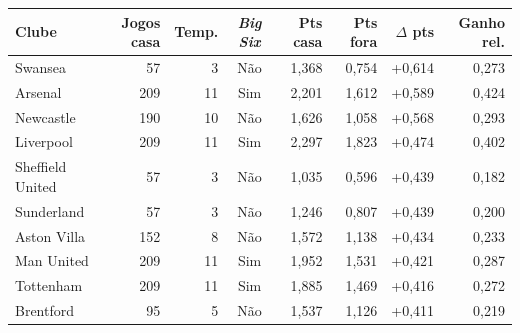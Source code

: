 \begin{tabular}{lrrcrrrr}
  \toprule
  Clube & Jogos casa & Temp. & \textit{Big Six} & Pts casa & Pts fora & $\Delta$ pts & Ganho rel. \\
  \midrule
  Swansea & 57 & 3 & Não & 1,368 & 0,754 & +0,614 & 0,273 \\
  Arsenal & 209 & 11 & Sim & 2,201 & 1,612 & +0,589 & 0,424 \\
  Newcastle & 190 & 10 & Não & 1,626 & 1,058 & +0,568 & 0,293 \\
  Liverpool & 209 & 11 & Sim & 2,297 & 1,823 & +0,474 & 0,402 \\
  Sheffield United & 57 & 3 & Não & 1,035 & 0,596 & +0,439 & 0,182 \\
  Sunderland & 57 & 3 & Não & 1,246 & 0,807 & +0,439 & 0,200 \\
  Aston Villa & 152 & 8 & Não & 1,572 & 1,138 & +0,434 & 0,233 \\
  Man United & 209 & 11 & Sim & 1,952 & 1,531 & +0,421 & 0,287 \\
  Tottenham & 209 & 11 & Sim & 1,885 & 1,469 & +0,416 & 0,272 \\
  Brentford & 95 & 5 & Não & 1,537 & 1,126 & +0,411 & 0,219 \\
  \bottomrule
\end{tabular}
